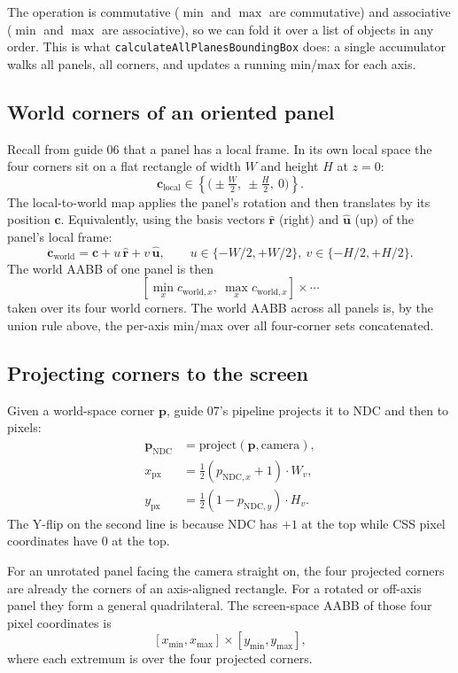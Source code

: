 \documentclass{article}
\begin{document}
The operation is commutative ($\min$ and $\max$ are commutative) and associative
($\min$ and $\max$ are associative), so we can fold it over a list of objects in any
order. This is what \texttt{calculateAllPlanesBoundingBox} does: a single accumulator
walks all panels, all corners, and updates a running min/max for each axis.

\subsection{World corners of an oriented panel}

Recall from guide 06 that a panel has a local frame. In its own local space the four
corners sit on a flat rectangle of width $W$ and height $H$ at $z = 0$:
\[
  \mathbf{c}_{\mathrm{local}} \in \left\{
    \big(\pm \tfrac{W}{2},\ \pm \tfrac{H}{2},\ 0\big)
  \right\}.
\]
The local-to-world map applies the panel's rotation and then translates by its position
$\mathbf{c}$. Equivalently, using the basis vectors $\hat{\mathbf{r}}$ (right) and
$\hat{\mathbf{u}}$ (up) of the panel's local frame:
\[
  \mathbf{c}_{\mathrm{world}} = \mathbf{c} + u\,\hat{\mathbf{r}} + v\,\hat{\mathbf{u}},
  \qquad u \in \{-W/2, +W/2\},\ v \in \{-H/2, +H/2\}.
\]
The world AABB of one panel is then
\[
  [\min_x c_{\mathrm{world},x},\ \max_x c_{\mathrm{world},x}] \times \cdots
\]
taken over its four world corners. The world AABB across all panels is, by the union
rule above, the per-axis min/max over all four-corner sets concatenated.

\subsection{Projecting corners to the screen}

Given a world-space corner $\mathbf{p}$, guide 07's pipeline projects it to NDC and then
to pixels:
\begin{align*}
  \mathbf{p}_{\mathrm{NDC}} &= \mathrm{project}(\mathbf{p}, \text{camera}), \\
  x_{\mathrm{px}} &= \tfrac{1}{2}(p_{\mathrm{NDC},x} + 1) \cdot W_v, \\
  y_{\mathrm{px}} &= \tfrac{1}{2}(1 - p_{\mathrm{NDC},y}) \cdot H_v.
\end{align*}
The Y-flip on the second line is because NDC has $+1$ at the top while CSS pixel
coordinates have $0$ at the top.

For an unrotated panel facing the camera straight on, the four projected corners are
already the corners of an axis-aligned rectangle. For a rotated or off-axis panel they
form a general quadrilateral. The screen-space AABB of those four pixel coordinates is
\[
  [x_{\min}, x_{\max}] \times [y_{\min}, y_{\max}],
\]
where each extremum is over the four projected corners.
\end{document}
